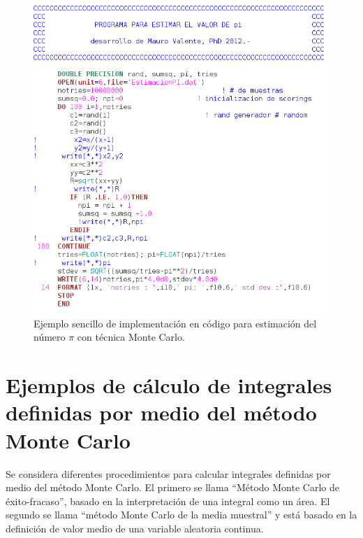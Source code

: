 \begin{center}
\begin{figure} [!h]

\centering
\includegraphics[width=12cm]{Figuras/Fig7_1.png}
   
\caption{Ejemplo sencillo de implementaci\'on en c\'odigo para estimaci\'on del n\'umero $\pi$ con t\'ecnica Monte Carlo.}
\label{Fig7_1}

\end{figure}
\end{center}




\section{Ejemplos de c\'alculo de integrales definidas por medio del m\'etodo Monte Carlo}
\label{CapVII_4}

Se considera diferentes procedimientos para calcular integrales definidas por medio del m\'etodo Monte Carlo. 
%
El primero se llama ``M\'etodo Monte Carlo de \'exito-fracaso'', basado en la interpretaci\'on de una integral como un \'area. 
%
El segundo se llama ``m\'etodo Monte Carlo de la media muestral'' y est\'a basado en la definici\'on de valor medio de una variable 
aleatoria continua.
%


